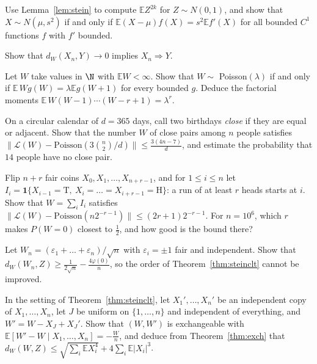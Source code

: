 \begin{exercise}[$\star$]\label{ex:gaussmoments}
Use Lemma~\ref{lem:stein} to compute $\mathbb EZ^{2k}$ for $Z\sim N(0,1)$, and show that $X\sim N(\mu,s^2)$ if and only if $\mathbb E(X-\mu)f(X)=s^2\mathbb Ef'(X)$ for all
bounded $C^1$ functions $f$ with $f'$ bounded.
\end{exercise}

\begin{exercise}[$\star$]\label{ex:dwlaw}
Show that $d_W(X_n,Y)\to0$ implies $X_n\Rightarrow Y$.
\end{exercise}

\begin{exercise}[$\star$]\label{ex:poissonchar}
Let $W$ take values in $\N$ with $\mathbb EW<\infty$. Show that $W\sim$ Poisson$(\lambda)$ if and only if $\mathbb E\,Wg(W)=\lambda\mathbb Eg(W+1)$ for every bounded $g$. Deduce the
factorial moments $\mathbb E\,W(W-1)\cdots(W-r+1)=\lambda^r$.
\end{exercise}

\begin{exercise}[$\star$]\label{ex:nearbirthday}
On a circular calendar of $d=365$ days, call two birthdays \emph{close} if they are equal or adjacent. Show that the number $W$ of close pairs among $n$ people
satisfies $\|\mathcal L(W)-\text{Poisson}(3\binom n2/d)\|\le\frac{3(4n-7)}d$, and estimate the probability that $14$ people have no close pair.
\end{exercise}

\begin{exercise}[$\star\star$]\label{ex:headruns}
Flip $n+r$ fair coins $X_0,X_1,\dots,X_{n+r-1}$, and for $1\le i\le n$ let $I_i=\mathbf 1\{X_{i-1}=\mathrm T,\ X_i=\dots=X_{i+r-1}=\mathrm H\}$: a run of at least $r$ heads starts at $i$.
Show that $W=\sum_iI_i$ satisfies $\|\mathcal L(W)-\text{Poisson}(n2^{-r-1})\|\le(2r+1)2^{-r-1}$. For $n=10^6$, which $r$ makes $P(W=0)$ closest to $\frac12$, and how good is the bound there?
\end{exercise}

\begin{exercise}[$\star\star$]\label{ex:latticedw}
Let $W_n=(\varepsilon_1+\dots+\varepsilon_n)/\sqrt n$ with $\varepsilon_i=\pm1$ fair and independent. Show that $d_W(W_n,Z)\ge\frac1{2\sqrt n}-\frac{4\varphi(0)}n$, so the order of
Theorem~\ref{thm:steinclt} cannot be improved.
\end{exercise}

\begin{exercise}[$\star\star$]\label{ex:exchclt}
In the setting of Theorem~\ref{thm:steinclt}, let $X_1',\dots,X_n'$ be an independent copy of $X_1,\dots,X_n$, let $J$ be uniform on $\{1,\dots,n\}$ and independent of
everything, and $W'=W-X_J+X_J'$. Show that $(W,W')$ is exchangeable with $\mathbb E[W'-W\mid X_1,\dots,X_n]=-\frac Wn$, and deduce from Theorem~\ref{thm:exch} that
$d_W(W,Z)\le\sqrt{\sum_i\mathbb EX_i^4}+4\sum_i\mathbb E|X_i|^3$.
\end{exercise}

